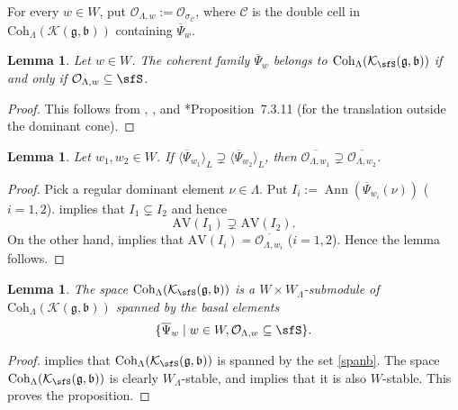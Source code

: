 \documentclass[12pt]{amsart}
\newcommand{\AV}{\mathrm{AV}}
\def\subset{\subseteq}
\newcommand{\CC}{{\mathcal {C}}}
\newcommand{\CK}{{\mathcal {K}}}
\newcommand{\CO}{{\mathcal {O}}}
\DeclareMathOperator{\Ann}{Ann}
\newcommand{\g}{\mathfrak g}
\renewcommand{\b}{\mathfrak b}
\newcommand{\la}{\langle}
\newcommand{\ra}{\rangle}
\newcommand{\be}{\begin {equation}}
\newcommand{\ee}{\end {equation}}
\numberwithin{equation}{section}
\newtheorem{lem}[thm]{Lemma}
\theoremstyle{remark}
\def\Coh{\mathrm{Coh}}
\begin{document}
For every $w\in W$, put $\CO_{\Lambda, w}:=\CO_{\sigma_\CC}$, where
                    $\CC$ is the double cell  in $\Coh_{\Lambda}( \CK(\g,\b))$ containing $\overline \Psi_w$.%



\begin{lem}\label{basalassv}
Let $w\in W$. The coherent family $\overline \Psi_w$ belongs to
$\Coh_{\Lambda}(\CK_\sfS(\g,\b))$ if and only if  $\CO_{\Lambda, w}\subset \sfS$.
\end{lem}
\begin{proof}
This follows from , ,  and
\cite{Vg}*{Proposition~7.3.11} (for the translation outside the dominant cone).
\end{proof}



\begin{lem}\label{assv33}
Let $w_1, w_2\in W$. If $\la \overline \Psi_{w_1}\ra_L\supsetneq \la \overline \Psi_{w_2}\ra_L$, then $\overline{\CO_{\Lambda, w_1}}\supsetneq \overline{\CO_{\Lambda, w_2}}$.

\end{lem}
\begin{proof}
Pick a  regular dominant element $\nu\in \Lambda$.
Put $I_i:=\Ann(\overline{\Psi}_{w_i}(\nu))$ ($i=1,2$).
 implies that  $I_1\subsetneq I_2$ and hence
\[
  \AV(I_1)\supsetneq \AV(I_2).
\]
On the other hand,  implies that  $\AV(I_i)=\overline{\CO_{\Lambda, w_i}}$ ($i=1,2$). Hence the lemma follows.
\end{proof}



\begin{lem}\label{basals}
The space $\Coh_{\Lambda}(\CK_\sfS(\g,\b))$ is a
$W\times W_\Lambda$-submodule
of $\Coh_{\Lambda}(\CK(\g,\b))$ spanned by the basal elements
\be\label{spanb}
 \{\overline \Psi_{w}\mid w\in W,  \CO_{\Lambda, w}\subset \sfS\}.
\ee
\end{lem}
\begin{proof}
  implies that  $\Coh_{\Lambda}(\CK_\sfS(\g,\b))$
is spanned by  the set \eqref{spanb}.
The space $\Coh_{\Lambda}(\CK_\sfS(\g,\b))$ is  clearly $W_\Lambda$-stable,
and  implies that it is also $W$-stable.
This proves the proposition.
\end{proof}
\end{document}

